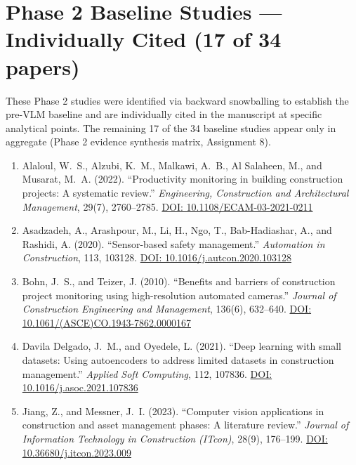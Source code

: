 \documentclass[11pt]{article}
\begin{document}
\section{Phase 2 Baseline Studies --- Individually Cited (17 of 34 papers)}

These Phase 2 studies were identified via backward snowballing to establish the pre-VLM baseline and are individually cited in the manuscript at specific analytical points. The remaining 17 of the 34 baseline studies appear only in aggregate (Phase 2 evidence synthesis matrix, Assignment 8).

\begin{enumerate}[label=\textbf{P2-\arabic*.}]

\item Alaloul, W.~S., Alzubi, K.~M., Malkawi, A.~B., Al Salaheen, M., and Musarat, M.~A. (2022). ``Productivity monitoring in building construction projects: A systematic review.'' \textit{Engineering, Construction and Architectural Management}, 29(7), 2760--2785. \href{https://doi.org/10.1108/ECAM-03-2021-0211}{DOI: 10.1108/ECAM-03-2021-0211}

\item Asadzadeh, A., Arashpour, M., Li, H., Ngo, T., Bab-Hadiashar, A., and Rashidi, A. (2020). ``Sensor-based safety management.'' \textit{Automation in Construction}, 113, 103128. \href{https://doi.org/10.1016/j.autcon.2020.103128}{DOI: 10.1016/j.autcon.2020.103128}

\item Bohn, J.~S., and Teizer, J. (2010). ``Benefits and barriers of construction project monitoring using high-resolution automated cameras.'' \textit{Journal of Construction Engineering and Management}, 136(6), 632--640. \href{https://doi.org/10.1061/(ASCE)CO.1943-7862.0000167}{DOI: 10.1061/(ASCE)CO.1943-7862.0000167}

\item Davila Delgado, J.~M., and Oyedele, L. (2021). ``Deep learning with small datasets: Using autoencoders to address limited datasets in construction management.'' \textit{Applied Soft Computing}, 112, 107836. \href{https://doi.org/10.1016/j.asoc.2021.107836}{DOI: 10.1016/j.asoc.2021.107836}

\item Jiang, Z., and Messner, J.~I. (2023). ``Computer vision applications in construction and asset management phases: A literature review.'' \textit{Journal of Information Technology in Construction (ITcon)}, 28(9), 176--199. \href{https://doi.org/10.36680/j.itcon.2023.009}{DOI: 10.36680/j.itcon.2023.009}


\end{enumerate}
\end{document}
